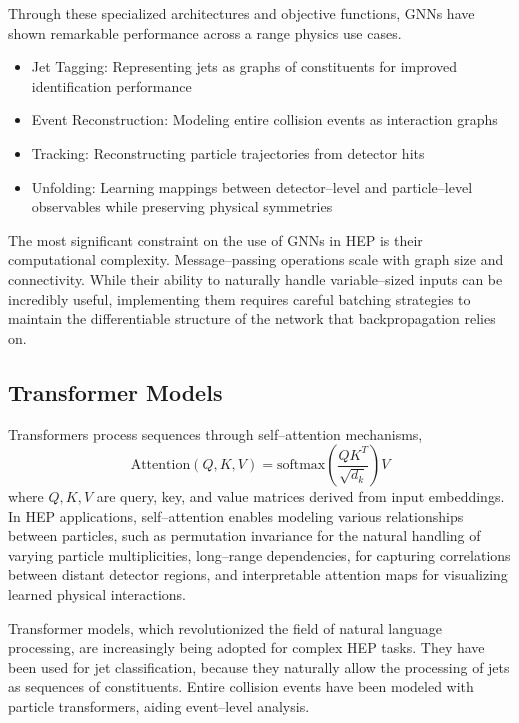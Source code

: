         Through these specialized architectures and objective functions, GNNs have shown remarkable performance across a range physics use cases.
        \begin{itemize}
            \item Jet Tagging: Representing jets as graphs of constituents for improved identification performance
            \item Event Reconstruction: Modeling entire collision events as interaction graphs
            \item Tracking: Reconstructing particle trajectories from detector hits
            \item Unfolding: Learning mappings between detector--level and particle--level observables while preserving physical symmetries
        \end{itemize}
        
        The most significant constraint on the use of GNNs in HEP is their computational complexity.
        Message--passing operations scale with graph size and connectivity.
        While their ability to naturally handle variable--sized inputs can be incredibly useful, implementing them requires careful batching strategies to maintain the differentiable structure of the network that backpropagation relies on.

    \subsection{Transformer Models}
        Transformers process sequences through self--attention mechanisms,
        \begin{equation}
            \text{Attention}(Q, K, V) = \text{softmax}\left(\frac{QK^T}{\sqrt{d_k}}\right)V
        \end{equation}
        where \(Q, K, V\) are query, key, and value matrices derived from input embeddings.
        In HEP applications, self--attention enables modeling various relationships between particles, such as
        permutation invariance for the natural handling of varying particle multiplicities,
        long--range dependencies, for capturing correlations between distant detector regions,
        and interpretable attention maps for visualizing learned physical interactions.

        Transformer models, which revolutionized the field of natural language processing, are increasingly being adopted for complex HEP tasks.
        They have been used for jet classification, because they naturally allow the processing of jets as sequences of constituents.
        Entire collision events have been modeled with particle transformers, aiding event--level analysis.

